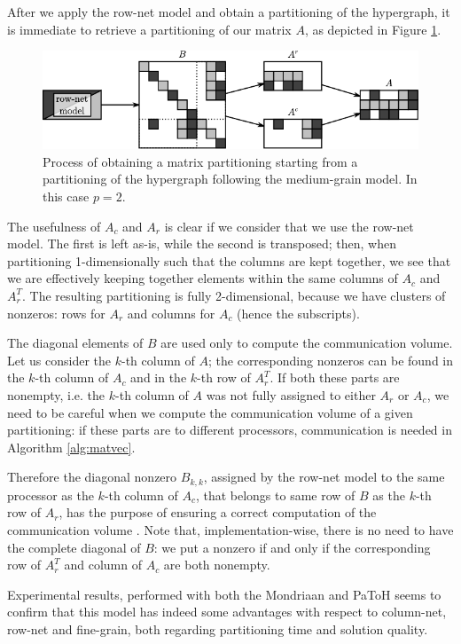 After we apply the row-net model and obtain a partitioning of the hypergraph, it is immediate to retrieve a partitioning of our matrix $A$, as depicted in Figure \ref{fig:mediumgrain-2}. 

\begin{figure}[h]
	\centering
	\includegraphics{img/mg-2}
	\caption{Process of obtaining a matrix partitioning starting from a partitioning of the hypergraph following the medium-grain model. In this case $p=2$.}
	\label{fig:mediumgrain-2}
\end{figure}

The usefulness of $A_c$ and $A_r$ is clear if we consider that we use the row-net model. The first is left as-is, while the second is transposed; then, when partitioning 1-dimensionally such that the columns are kept together, we see that we are effectively keeping together elements within the same columns of $A_c$ and $A_r^T$. The resulting partitioning is fully 2-dimensional, because we have clusters of nonzeros: rows for $A_r$ and columns for $A_c$ (hence the subscripts).

The diagonal elements of $B$ are used only to compute the communication volume. Let us consider the $k$-th column of $A$; the corresponding nonzeros can be found in the $k$-th column of $A_c$  and in the $k$-th row of $A_r^T$. If both these parts are nonempty, i.e. the $k$-th column of $A$ was not fully assigned to either $A_r$ or $A_c$, we need to be careful when we compute the communication volume of a given partitioning: if these parts are to different processors, communication is needed in Algorithm \ref{alg:matvec}.

Therefore the diagonal nonzero $B_{k,k}$, assigned by the row-net model to the same processor as the $k$-th column of $A_c$, that belongs to same row of $B$ as the $k$-th row of $A_r$, has the purpose of ensuring a correct computation of the communication volume \cite[Th.~3.1]{mediumgrain}. Note that, implementation-wise, there is no need to have the complete diagonal of $B$: we put a nonzero if and only if the corresponding row of $A_r^T$ and column of $A_c$ are both nonempty.

Experimental results, performed with both the Mondriaan and PaToH seems to confirm that this model has indeed some advantages with respect to column-net, row-net and fine-grain, both regarding partitioning time and solution quality.

